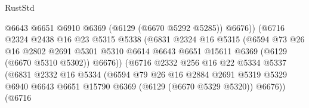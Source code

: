 \begin{lexlean}{RustStd}
\begin{coremodule}
                                    @6643
                                    @6651
                                    @6910
                                    @6369
                                    (@6129 (@6670 @5292 @5285))
                                    @6676))
                                (@6716
                                  @2324
                                  @2438
                                  @16
                                  @23
                                  @5315
                                  @5338
                                  (@6831
                                    @2324
                                    @16
                                    @5315
                                    (@6594
                                      @73
                                      @26
                                      @16
                                      @2802
                                      @2691
                                      @5301
                                      @5310
                                      @6614
                                      @6643
                                      @6651
                                      @15611
                                      @6369
                                      (@6129 (@6670 @5310 @5302))
                                      @6676))
                                  (@6716
                                    @2332
                                    @256
                                    @16
                                    @22
                                    @5334
                                    @5337
                                    (@6831
                                      @2332
                                      @16
                                      @5334
                                      (@6594
                                        @79
                                        @26
                                        @16
                                        @2884
                                        @2691
                                        @5319
                                        @5329
                                        @6940
                                        @6643
                                        @6651
                                        @15790
                                        @6369
                                        (@6129 (@6670 @5329 @5320))
                                        @6676))
                                    (@6716

\end{coremodule}
\end{lexlean}
